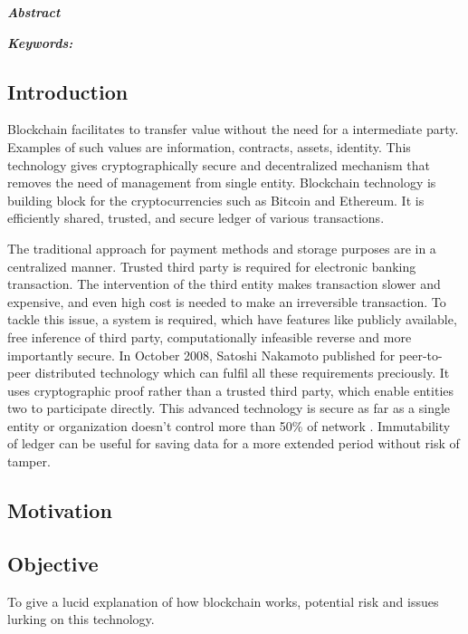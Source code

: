 \documentclass[a4paper,twoside,12pt]{report}
\begin{document}
\begin{spacing}{1}  %
\begingroup
\fontsize{12pt}{14pt}\selectfont
\begin{center}
	\Huge\bfseries
	\textit{Abstract}
\end{center}
\vspace{0.3in}
\textit{
\textbf{Keywords:} 
}
\endgroup
\end{spacing}
\begin{spacing}{1.5}
\tableofcontents
\listoffigures
\listoftables
\chapter{Introduction}
Blockchain facilitates to transfer value without the need for a intermediate party. Examples of such values are information, contracts, assets, identity. This technology gives cryptographically secure and decentralized mechanism that removes the need of management from single entity. Blockchain technology is building block for the cryptocurrencies such as Bitcoin and Ethereum. It is efficiently shared, trusted, and secure ledger of various transactions.  
\par
The traditional approach for payment methods and storage purposes are in a centralized manner. Trusted third party is required for electronic banking transaction. The intervention of the third entity makes transaction slower and expensive, and even high cost is needed to make an irreversible transaction. To tackle this issue, a system is required, which have features like publicly available, free inference of third party, computationally infeasible reverse and more importantly secure.  In October 2008, Satoshi Nakamoto published for peer-to-peer distributed technology which can fulfil all these requirements preciously. It uses cryptographic proof rather than a trusted third party, which enable entities two to participate directly. This advanced technology is secure as far as a single entity or organization doesn't control more than 50\% of network \cite{satoshinakamoto}. Immutability of ledger can be useful for saving data for a more extended period without risk of tamper.      
\section{Motivation}
\section{Objective}
To give a lucid explanation of how blockchain works, potential risk and issues lurking on this technology.

\end{spacing}
\end{document}

